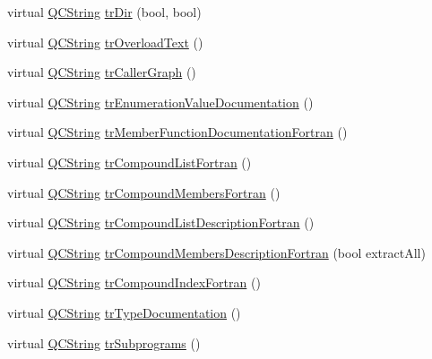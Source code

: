 \begin{DoxyCompactItemize}
\item 
virtual \mbox{\hyperlink{class_q_c_string}{Q\+C\+String}} \mbox{\hyperlink{class_translator_japanese_a08f91c6cd462e77469139a47f04777c7}{tr\+Dir}} (bool, bool)
\item 
virtual \mbox{\hyperlink{class_q_c_string}{Q\+C\+String}} \mbox{\hyperlink{class_translator_japanese_a2b504f1eeebf18f26ed6c6696432e178}{tr\+Overload\+Text}} ()
\item 
virtual \mbox{\hyperlink{class_q_c_string}{Q\+C\+String}} \mbox{\hyperlink{class_translator_japanese_a954ec2b6811c3c9e02023be9ed7c0f15}{tr\+Caller\+Graph}} ()
\item 
virtual \mbox{\hyperlink{class_q_c_string}{Q\+C\+String}} \mbox{\hyperlink{class_translator_japanese_af07831d86b7a4f50b7fd3133cec19435}{tr\+Enumeration\+Value\+Documentation}} ()
\item 
virtual \mbox{\hyperlink{class_q_c_string}{Q\+C\+String}} \mbox{\hyperlink{class_translator_japanese_a771a6eff68529e84c4a7d45dcf275ce1}{tr\+Member\+Function\+Documentation\+Fortran}} ()
\item 
virtual \mbox{\hyperlink{class_q_c_string}{Q\+C\+String}} \mbox{\hyperlink{class_translator_japanese_a2584089d5a59af148ae40bf306e01453}{tr\+Compound\+List\+Fortran}} ()
\item 
virtual \mbox{\hyperlink{class_q_c_string}{Q\+C\+String}} \mbox{\hyperlink{class_translator_japanese_a33ef8b96e715216da5a944f4cd64d254}{tr\+Compound\+Members\+Fortran}} ()
\item 
virtual \mbox{\hyperlink{class_q_c_string}{Q\+C\+String}} \mbox{\hyperlink{class_translator_japanese_ac53f12f510b4b1919134719b58ff5e30}{tr\+Compound\+List\+Description\+Fortran}} ()
\item 
virtual \mbox{\hyperlink{class_q_c_string}{Q\+C\+String}} \mbox{\hyperlink{class_translator_japanese_a23b306cff1d8f703e3a1789414ad6111}{tr\+Compound\+Members\+Description\+Fortran}} (bool extract\+All)
\item 
virtual \mbox{\hyperlink{class_q_c_string}{Q\+C\+String}} \mbox{\hyperlink{class_translator_japanese_a21fe76ea8b0c8c210a94c65d171dcc60}{tr\+Compound\+Index\+Fortran}} ()
\item 
virtual \mbox{\hyperlink{class_q_c_string}{Q\+C\+String}} \mbox{\hyperlink{class_translator_japanese_acb201d57d0c010243e24e1262ddd6271}{tr\+Type\+Documentation}} ()
\item 
virtual \mbox{\hyperlink{class_q_c_string}{Q\+C\+String}} \mbox{\hyperlink{class_translator_japanese_acd8b5b61925f4d04424f10111f94daae}{tr\+Subprograms}} ()

\end{DoxyCompactItemize}
